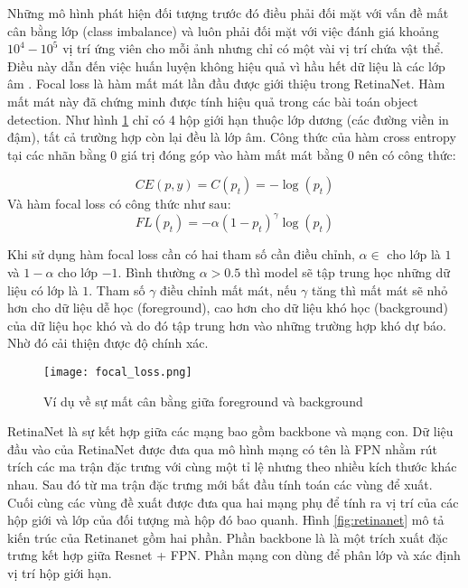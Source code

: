 \documentclass[../the.tex]{subfiles}
\begin{document}
{\fontsize{13}{12} \selectfont

	Những mô hình phát hiện đối tượng trước đó điều phải đối mặt với vấn đề mất cân bằng lớp (class imbalance) và luôn phải đối mặt với việc đánh giá khoảng $10^4 - 10^5$ vị trí ứng viên cho mỗi ảnh nhưng chỉ có một vài vị trí chứa vật thể.
	Điều này dẫn đến việc huấn luyện không hiệu quả vì hầu hết dữ liệu là các lớp âm \cite{lin2018focal}. Focal loss là hàm mất mát lần đầu được giới thiệu trong RetinaNet. Hàm mất mát này đã chứng minh được tính hiệu quả trong các bài toán object detection.
	Như hình \ref{fig:focal_loss} chỉ có 4 hộp giới hạn thuộc lớp dương (các đường viền in đậm), tất cả trường hợp còn lại đều là lớp âm. Công thức của hàm cross entropy tại các nhãn bằng 0 giá trị đóng góp vào hàm mất mát bằng 0 nên có công thức:

	\begin{equation}
		CE(p,y) = C(p_t) =  -\log(p_t)
	\end{equation}
	Và hàm focal loss có công thức như sau:
	\begin{equation}
		FL(p_t) = -\alpha(1-p_t)^\gamma \log(p_t)
	\end{equation}

	Khi sử dụng hàm focal loss cần có hai tham số cần điều chỉnh, $\alpha \in$ cho lớp là $1$ và $1 - \alpha$ cho lớp $-1$.
	Bình thường $\alpha > 0.5$ thì model sẽ tập trung học những dữ liệu có lớp là $1$. Tham số $\gamma$ điều chỉnh mất mát,
	nếu $\gamma$ tăng thì mất mát sẽ nhỏ hơn cho dữ liệu dễ học (foreground), cao hơn cho dữ liệu khó học (background) của dữ liệu học khó
	và do đó tập trung hơn vào những trường hợp khó dự báo. Nhờ đó cải thiện được độ chính xác.

}

\begin{figure}[H]
	\centering
	\texttt{[image: focal\_loss.png]}
	\caption{Ví dụ về sự mất cân bằng giữa  foreground và background\cite{lin2018focal}}
	\label{fig:focal_loss}
\end{figure}

{\fontsize{13}{12} \selectfont

RetinaNet là sự kết hợp giữa các mạng bao gồm backbone và mạng con. Dữ
liệu đầu vào của RetinaNet được đưa qua mô hình mạng có tên là FPN \cite{lin2017feature} nhằm rút trích các ma trận đặc trưng với
cùng một tỉ lệ nhưng theo nhiều kích thước khác nhau. Sau đó từ ma trận đặc trưng mới bắt đầu tính toán các vùng để
xuất. Cuối cùng các vùng đề xuất được đưa qua hai mạng phụ để tính ra vị trí của các hộp giới và lớp của đối
tượng mà hộp đó bao quanh. Hình \ref{fig:retinanet} mô tả kiến trúc của Retinanet gồm hai phần. Phần backbone là
là một trích xuất đặc trưng kết hợp giữa Resnet + FPN. Phần mạng con dùng để phân lớp và
xác định vị trí hộp giới hạn.

}
\end{document}
